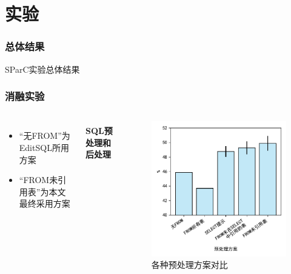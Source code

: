 \documentclass{ctexbeamer}
\begin{document}
\section{实验}
\begin{frame}
  \frametitle{总体结果}
  \begin{table}
    
    \caption{SParC实验总体结果}
  \end{table}
\end{frame}
\begin{frame}
  \frametitle{消融实验}
  \begin{columns}
    \begin{itemize}
      \item “无FROM”为EditSQL所用方案
      \item “FROM未引用表”为本文最终采用方案
    \end{itemize}
    \framesubtitle{SQL预处理和后处理}
    \begin{figure}
      \includegraphics[height=0.68\textheight]{figure/preprocess.pdf}
      \caption{各种预处理方案对比}
    \end{figure}
  \end{columns}
\end{frame}
\end{document}
